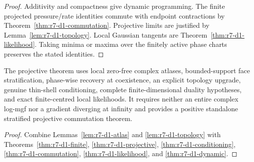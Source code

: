 \begin{proof}
Additivity and compactness give dynamic programming.  The finite projected
pressure/rate identities commute with endpoint contractions by
Theorem~\ref{thm:r7-d1-commutation}.  Projective limits are justified by
Lemma~\ref{lem:r7-d1-topology}.  Local Gaussian tangents are
Theorem~\ref{thm:r7-d1-likelihood}.  Taking minima or maxima over the finitely
active phase charts preserves the stated identities.
\end{proof}

\begin{theorem}
\label{thm:r7-d1-main}
The projective theorem uses local zero-free complex atlases, bounded-support
face stratification, phase-wise recovery at coexistence, an explicit topology
upgrade, genuine thin-shell conditioning, complete finite-dimensional duality
hypotheses, and exact finite-centred local likelihoods.  It requires neither an
entire complex log-mgf nor a gradient diverging at infinity and provides a
positive standalone stratified projective commutation theorem.
\end{theorem}

\begin{proof}
Combine Lemmas~\ref{lem:r7-d1-atlas} and
\ref{lem:r7-d1-topology} with
Theorems~\ref{thm:r7-d1-finite},
\ref{thm:r7-d1-projective},
\ref{thm:r7-d1-conditioning},
\ref{thm:r7-d1-commutation},
\ref{thm:r7-d1-likelihood}, and
\ref{thm:r7-d1-dynamic}.
\end{proof}
